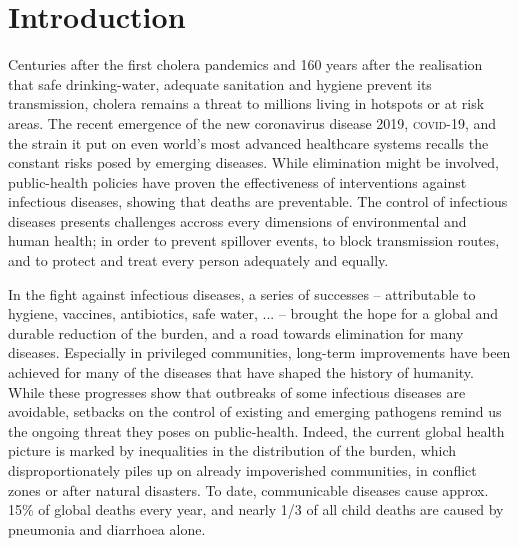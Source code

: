 \chapter*{Introduction} %
 Centuries after the first cholera pandemics and 160 years after the realisation that safe drinking-water, adequate sanitation and hygiene prevent its transmission, cholera remains a threat to millions living in hotspots or at risk areas. The recent emergence of the new coronavirus disease 2019, \textsc{covid}-19, and the strain it put on even world's most advanced healthcare systems recalls the constant risks posed by emerging diseases. 
While elimination might be involved, public-health policies have proven the effectiveness of interventions against infectious diseases, showing that deaths are preventable. The control of infectious diseases presents challenges accross every dimensions of environmental and human health; in order to prevent spillover events, to block transmission routes, and to protect and treat every person adequately and equally. 

In the fight against infectious diseases, a series of successes -- attributable to \eg hygiene, vaccines, antibiotics, safe water, ... -- brought the hope for a global and durable reduction of the burden, and a road towards elimination for many diseases. Especially in privileged communities, long-term improvements have been achieved for many of the diseases that have shaped the history of humanity. While these progresses show that outbreaks of some infectious diseases are avoidable, setbacks on the control of existing and emerging pathogens remind us the ongoing threat they poses on public-health. Indeed, the current global health picture is marked by inequalities in the distribution of the burden, which disproportionately piles up on already impoverished communities, in conflict zones or after natural disasters. To date, communicable diseases cause approx. 15\% of global deaths every year\cite[-4\baselineskip][Table 1, excl. non-transmissible neonatal and maternal diseases and nutritional diseases; pre-\textsc{covid}-19 estimates]{Roth:GlobalRegionalNational:2018}, and nearly 1/3 of all child deaths are caused by pneumonia and diarrhoea alone\cite[][\textsc{M} deaths among under 5, every year.]{WHO:EndingPreventableChild:2013}.
 
